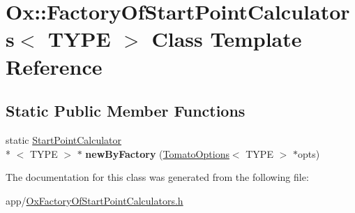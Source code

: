 \hypertarget{class_ox_1_1_factory_of_start_point_calculators}{\section{Ox\-:\-:Factory\-Of\-Start\-Point\-Calculators$<$ T\-Y\-P\-E $>$ Class Template Reference}
\label{class_ox_1_1_factory_of_start_point_calculators}
}
\subsection*{Static Public Member Functions}
\begin{DoxyCompactItemize}
\item 
\hypertarget{class_ox_1_1_factory_of_start_point_calculators_a1b2f350cc38b9d23e65bc50eee2f3c9a}{static \hyperlink{class_ox_1_1_start_point_calculator}{Start\-Point\-Calculator}\\*
$<$ T\-Y\-P\-E $>$ $\ast$ {\bfseries new\-By\-Factory} (\hyperlink{struct_ox_1_1_tomato_options}{Tomato\-Options}$<$ T\-Y\-P\-E $>$ $\ast$opts)}\label{class_ox_1_1_factory_of_start_point_calculators_a1b2f350cc38b9d23e65bc50eee2f3c9a}

\end{DoxyCompactItemize}


The documentation for this class was generated from the following file\-:\begin{DoxyCompactItemize}
\item 
app/\hyperlink{_ox_factory_of_start_point_calculators_8h}{Ox\-Factory\-Of\-Start\-Point\-Calculators.\-h}\end{DoxyCompactItemize}
